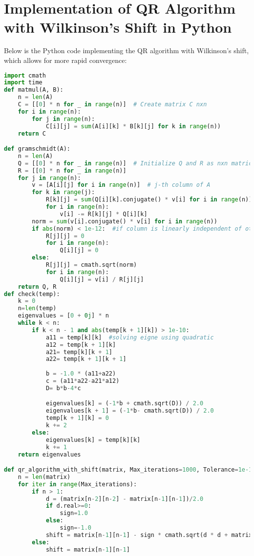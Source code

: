 \documentclass[journal]{IEEEtran}
\begin{document}
\section{Implementation of QR Algorithm with Wilkinson's Shift in Python}
Below is the Python code implementing the QR algorithm with Wilkinson's shift, which allows for more rapid convergence:
\begin{lstlisting}[language=Python, caption=QR Algorithm with Wilkinson's Shift in Python]
import cmath
import time
def matmul(A, B):
    n = len(A)
    C = [[0] * n for _ in range(n)]  # Create matrix C nxn
    for i in range(n):
        for j in range(n):
            C[i][j] = sum(A[i][k] * B[k][j] for k in range(n))
    return C

def gramschmidt(A):
    n = len(A)
    Q = [[0] * n for _ in range(n)]  # Initialize Q and R as nxn matrices
    R = [[0] * n for _ in range(n)]
    for j in range(n):
        v = [A[i][j] for i in range(n)]  # j-th column of A
        for k in range(j):
            R[k][j] = sum(Q[i][k].conjugate() * v[i] for i in range(n)) #projection of the current vector with the vector we are orthogalizing
            for i in range(n):
                v[i] -= R[k][j] * Q[i][k]
        norm = sum(v[i].conjugate() * v[i] for i in range(n))
        if abs(norm) < 1e-12:  #if column is linearly independent of other column
            R[j][j] = 0
            for i in range(n):
                Q[i][j] = 0
        else:
            R[j][j] = cmath.sqrt(norm)
            for i in range(n):
                Q[i][j] = v[i] / R[j][j]
    return Q, R
def check(temp):
    k = 0
    n=len(temp)
    eigenvalues = [0 + 0j] * n
    while k < n:
        if k < n - 1 and abs(temp[k + 1][k]) > 1e-10:
            a11 = temp[k][k]  #solving eigne using quadratic
            a12 = temp[k + 1][k]
            a21= temp[k][k + 1]
            a22= temp[k + 1][k + 1]
            
            b = -1.0 * (a11+a22)
            c = (a11*a22-a21*a12)
            D= b*b-4*c

            eigenvalues[k] = (-1*b + cmath.sqrt(D)) / 2.0
            eigenvalues[k + 1] = (-1*b- cmath.sqrt(D)) / 2.0
            temp[k + 1][k] = 0
            k += 2
        else:
            eigenvalues[k] = temp[k][k]
            k += 1
    return eigenvalues

def qr_algorithm_with_shift(matrix, Max_iterations=1000, Tolerance=1e-10):
    n = len(matrix)
    for iter in range(Max_iterations):
        if n > 1:
            d = (matrix[n-2][n-2] - matrix[n-1][n-1])/2.0
            if d.real>=0:
                sign=1.0
            else:
                sign=-1.0
            shift = matrix[n-1][n-1] - sign * cmath.sqrt(d * d + matrix[n-1][n-2] * matrix[n-2][n-1])
        else:
            shift = matrix[n-1][n-1]
        

\end{lstlisting}
\end{document}
